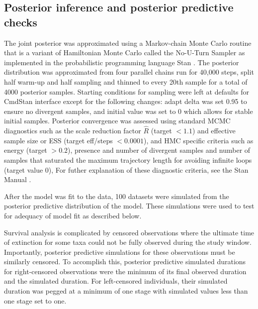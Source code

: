 \documentclass[11pt]{article}
\begin{document}
\subsection*{Posterior inference and posterior predictive checks}

The joint posterior was approximated using a Markov-chain Monte Carlo routine that is a variant of Hamiltonian Monte Carlo called the No-U-Turn Sampler \citep{Hoffman2014} as implemented in the probabilistic programming language Stan \citep{2014stan}. The posterior distribution was approximated from four parallel chains run for 40,000 steps, split half warm-up and half sampling and thinned to every 20th sample for a total of 4000 posterior samples. Starting conditions for sampling were left at defaults for CmdStan interface except for the following changes: adapt delta was set 0.95 to ensure no divergent samples, and initial value was set to 0 which allows for stable initial samples. Posterior convergence was assessed using standard MCMC diagnostics such as the scale reduction factor \(\hat{R}\) (target \(<1.1\)) and effective sample size or ESS (target eff/steps \(<0.0001\)), and HMC specific criteria such as energy (target \(>0.2\)), presence and number of divergent samples and number of samples that saturated the maximum trajectory length for avoiding infinite loops (target value 0), For futher explanation of these diagnostic criteria, see the Stan Manual \citep{StanManual}.

After the model was fit to the data, 100 datasets were simulated from the posterior predictive distribution of the model. These simulations were used to test for adequacy of model fit as described below.

Survival analysis is complicated by censored observations where the ultimate time of extinction for some taxa could not be fully observed during the study window. Importantly, posterior predictive simulations for these observations must be similarly censored. To accomplish this, posterior predictive simulated durations for right-censored observations were the minimum of its final observed duration and the simulated duration. For left-censored individuals, their simulated duration was pegged at a minimum of one stage with simulated values less than one stage set to one.
\end{document}
